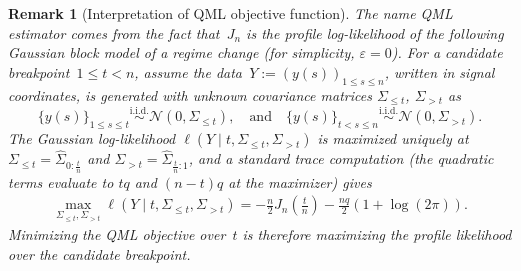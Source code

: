 \documentclass[10pt, letterpaper]{amsart}
\newtheorem{remark}[theorem]{Remark}
\begin{document}
\begin{remark}[Interpretation of QML objective function]\label{rem:interpretation_qml_objective_function}
The name QML estimator comes from the fact that~$J_n$ is the profile log-likelihood of the following Gaussian block model of a regime change (for simplicity, $\varepsilon=0$). For a candidate breakpoint~$1\leq t<n$, assume the data~$Y:=(y(s))_{1\leq s\leq n}$, written in signal coordinates, is generated with unknown covariance matrices $\Sigma_{\leq t}$, $\Sigma_{>t}$ as
\[
\{y(s)\}_{ 1\leq s \leq t} \stackrel{\mathrm{i.i.d.}}{\sim}\mathcal N(0,\Sigma_{\leq t}),
\quad \mbox{and} \quad
\{y(s)\}_{t < s \leq n}\stackrel{\mathrm{i.i.d.}}{\sim}\mathcal N(0,\Sigma_{>t}).
\]
The Gaussian log-likelihood $\ell(Y\mid t,\Sigma_{\leq t},\Sigma_{>t})$ is maximized uniquely at $\Sigma_{\leq t}=\widehat\Sigma_{0:\frac tn}$ and $\Sigma_{>t}=\widehat\Sigma_{\frac tn:1}$, and a standard trace computation (the quadratic terms evaluate to $tq$ and $(n-t)q$ at the maximizer) gives
\begin{align}
    \max_{\Sigma_{\leq t} , \Sigma_{>t}} \ell(Y \mid t, \Sigma_{\leq t} , \Sigma_{>t} )
   =  - \frac{n}{2} J_{n}\!\left(\tfrac{t}{n}\right) - \frac{nq}{2} \left(1 + \log(2 \pi)\right).
\end{align}
Minimizing the QML objective over~$t$ is therefore maximizing the profile likelihood over the candidate breakpoint.
\end{remark}
\end{document}
